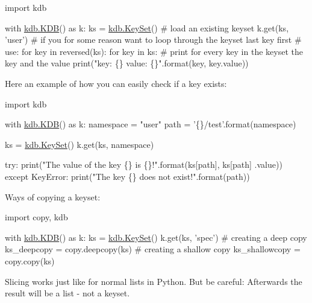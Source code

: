 \begin{DoxyCode}
\textcolor{keyword}{import} kdb

with \hyperlink{classkdb_1_1KDB}{kdb.KDB}() \textcolor{keyword}{as} k:
    ks = \hyperlink{classkdb_1_1KeySet}{kdb.KeySet}()
    \textcolor{comment}{# load an existing keyset}
    k.get(ks, \textcolor{stringliteral}{'user'})
    \textcolor{comment}{# if you for some reason want to loop through the keyset last key first}
    \textcolor{comment}{# use: for key in reversed(ks):}
    \textcolor{keywordflow}{for} key \textcolor{keywordflow}{in} ks:
        \textcolor{comment}{# print for every key in the keyset the key and the value}
        print(\textcolor{stringliteral}{"key: \{\} value: \{\}"}.format(key, key.value))
\end{DoxyCode}


Here an example of how you can easily check if a key exists\+:


\begin{DoxyCode}
\textcolor{keyword}{import} kdb

with \hyperlink{classkdb_1_1KDB}{kdb.KDB}() \textcolor{keyword}{as} k:
    namespace = \textcolor{stringliteral}{"user"}
    path = \textcolor{stringliteral}{'\{\}/test'}.format(namespace)

    ks = \hyperlink{classkdb_1_1KeySet}{kdb.KeySet}()
    k.get(ks, namespace)

    \textcolor{keywordflow}{try}:
        print(\textcolor{stringliteral}{"The value of the key \{\} is \{\}!"}.format(ks[path], ks[path]
                                                      .value))
    \textcolor{keywordflow}{except} KeyError:
        print(\textcolor{stringliteral}{"The key \{\} does not exist!"}.format(path))
\end{DoxyCode}


Ways of copying a keyset\+:


\begin{DoxyCode}
\textcolor{keyword}{import} copy, kdb

with \hyperlink{classkdb_1_1KDB}{kdb.KDB}() \textcolor{keyword}{as} k:
    ks = \hyperlink{classkdb_1_1KeySet}{kdb.KeySet}()
    k.get(ks, \textcolor{stringliteral}{'spec'})
    \textcolor{comment}{# creating a deep copy}
    ks\_deepcopy = copy.deepcopy(ks)
    \textcolor{comment}{# creating a shallow copy}
    ks\_shallowcopy = copy.copy(ks)
\end{DoxyCode}


Slicing works just like for normal lists in Python. But be careful\+: Afterwards the result will be a list -\/ not a keyset.


